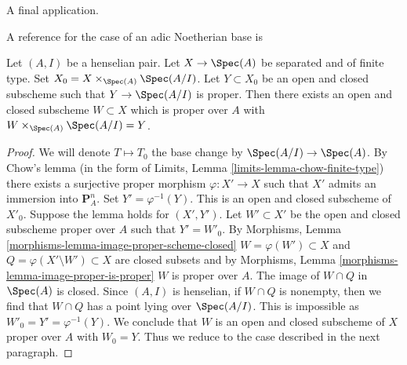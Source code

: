 \noindent
A final application.

\begin{lemma}
\label{lemma-split-off-proper-part-henselian}
\begin{reference}
A reference for the case of an adic Noetherian base is
\cite[III, Proposition 5.5.1]{EGA}
\end{reference}
Let $(A, I)$ be a henselian pair. Let $X \to \Spec(A)$
be separated and of finite type. Set $X_0 = X \times_{\Spec(A)} \Spec(A/I)$.
Let $Y \subset X_0$ be an open and closed subscheme such that
$Y \to \Spec(A/I)$ is proper. Then there exists an open and closed
subscheme $W \subset X$ which is proper over $A$ with
$W \times_{\Spec(A)} \Spec(A/I) = Y$.
\end{lemma}

\begin{proof}
We will denote $T \mapsto T_0$ the base change by $\Spec(A/I) \to \Spec(A)$.
By Chow's lemma (in the form of
Limits, Lemma \ref{limits-lemma-chow-finite-type})
there exists a surjective proper morphism $\varphi : X' \to X$ such
that $X'$ admits an immersion into $\mathbf{P}^n_A$.
Set $Y' = \varphi^{-1}(Y)$. This is an open and closed subscheme
of $X'_0$. Suppose the lemma holds for $(X', Y')$. Let $W' \subset X'$
be the open and closed subscheme proper over $A$ such that $Y' = W'_0$.
By Morphisms, Lemma \ref{morphisms-lemma-image-proper-scheme-closed}
$W = \varphi(W') \subset X$ and
$Q = \varphi(X' \setminus W') \subset X$ are closed subsets and by
Morphisms, Lemma \ref{morphisms-lemma-image-proper-is-proper}
$W$ is proper over $A$. The image of $W \cap Q$ in $\Spec(A)$ is closed.
Since $(A, I)$ is henselian, if $W \cap Q$ is nonempty, then we
find that $W \cap Q$ has a point lying over $\Spec(A/I)$.
This is impossible as $W'_0 = Y' = \varphi^{-1}(Y)$.
We conclude that $W$ is an open and closed subscheme
of $X$ proper over $A$ with $W_0 = Y$.
Thus we reduce to the case described in the next paragraph.


\end{proof}
